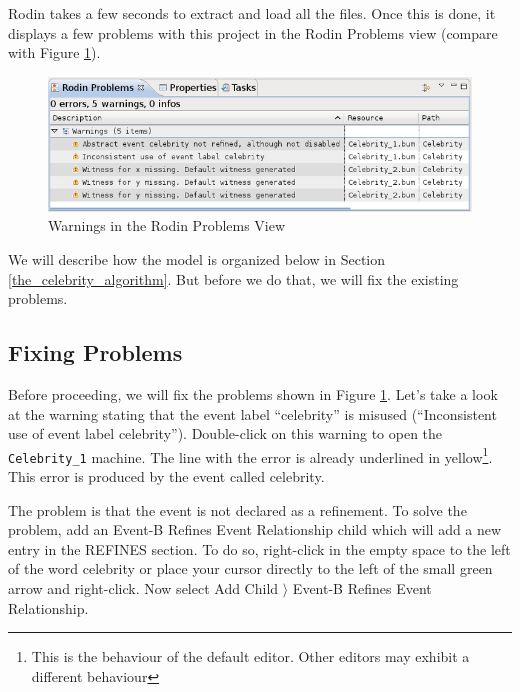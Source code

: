 Rodin takes a few seconds to extract and load all the files. Once this is done, it displays a few problems with this project in the Rodin Problems view (compare with Figure \ref{fig_tut_08_rodin_problemview}).

\begin{figure}[!ht]
\begin{center}
	\includegraphics{img/tutorial/tut_08_rodin_problems.png}
	\caption{Warnings in the Rodin Problems View}
	\label{fig_tut_08_rodin_problemview}
\end{center}
\end{figure}

We will describe how the model is organized below in Section \ref{the_celebrity_algorithm}.  But before we do that, we will fix the existing problems.

\subsection{Fixing Problems}
\label{tut_celebrity_fixing problems}

Before proceeding, we will fix the problems shown in Figure \ref{fig_tut_08_rodin_problemview}. Let's take a look at the warning stating that the event label ``celebrity'' is misused (``Inconsistent use of event label celebrity''). Double-click on this warning to open the \texttt{Celebrity\_1} machine. The line with the error is already underlined in yellow\footnote{This is the behaviour of the default editor.  Other editors may exhibit a different behaviour}. This error is produced by the event called \textsf{celebrity}.

The problem is that the event is not declared as a refinement. To solve the problem, add an \textsf{Event-B Refines Event Relationship} child which will add a new entry in the \textsf{REFINES} section.  To do so, right-click in the empty space to the left of the word \textsf{celebrity} or place your cursor directly to the left of the small green arrow and right-click. Now select \textsf{Add Child $\rangle$ Event-B Refines Event Relationship}.

